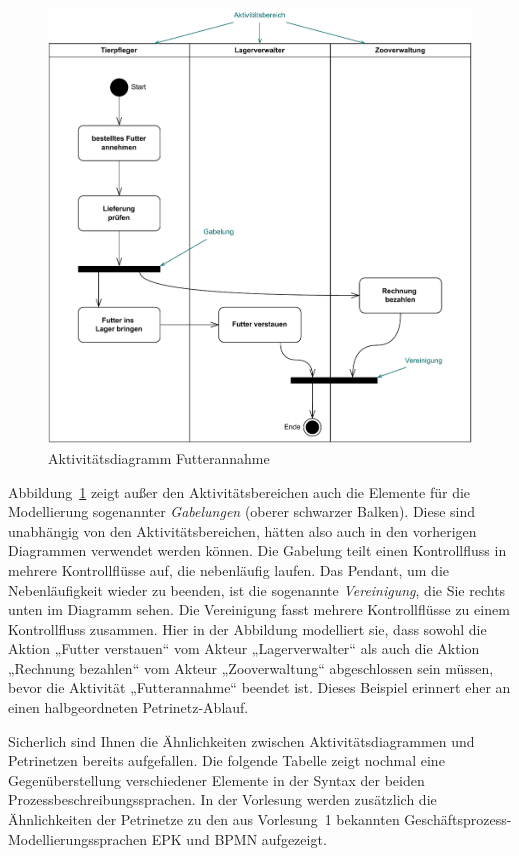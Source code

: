 \begin{figure}[h!]
	\centering
	\includegraphics[scale=0.7]{Bilder/Kapitel-5/aktivitaetsdiagramm_futterannahme.pdf}
	\caption{Aktivitätsdiagramm Futterannahme}
	\label{fig:aktivitaetsdiagramm_futterannahme}
\end{figure}

Abbildung~\ref{fig:aktivitaetsdiagramm_futterannahme} zeigt außer den Aktivitätsbereichen auch die Elemente für die Model\-lie\-rung
sogenannter \textit{Gabelungen} (oberer schwarzer Balken). Diese sind unabhängig von den Aktivitätsbereichen, hätten also auch in den vorherigen Diagrammen verwendet werden können. Die Gabelung teilt einen Kontrollfluss in mehrere Kontrollflüsse auf, die nebenläufig laufen. Das Pendant, um die Nebenläufigkeit wieder zu beenden, ist die sogenannte \textit{Vereinigung}, die Sie rechts unten im Diagramm sehen. Die Vereinigung fasst mehrere Kontrollflüsse zu einem Kontrollfluss zusammen. Hier in der Abbildung modelliert sie, dass sowohl die Aktion „Futter verstauen“ vom Akteur „Lagerverwalter“ als auch die Aktion „Rechnung bezahlen“ vom Akteur „Zooverwaltung“ abgeschlossen sein müssen, bevor die Aktivität „Futterannahme“ beendet ist. Dieses Beispiel erinnert eher an einen halbgeordneten Petrinetz-Ablauf.

Sicherlich sind Ihnen die Ähnlichkeiten zwischen Aktivitätsdiagrammen und Petri\-netzen bereits aufgefallen. Die folgende Tabelle zeigt nochmal eine Gegenüber\-stellung verschiedener Elemente in der Syntax der beiden Prozess\-beschreibungs\-sprachen. In der Vorlesung werden zusätzlich die Ähnlichkeiten der Petrinetze zu den aus Vor\-lesung~1 bekannten Geschäftsprozess-Modellierungssprachen EPK und BPMN aufgezeigt.



